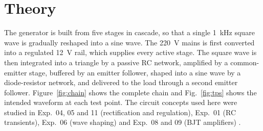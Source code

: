 \documentclass[12pt,a4paper]{article}
\begin{document}
	\section{Theory}
	\label{sec:theory}
	The generator is built from five stages in cascade, so that a single \SI{1}{\kilo\hertz} square wave is gradually reshaped into a sine wave. The \SI{220}{\volt} mains is first converted into a regulated \SI{12}{\volt} rail, which supplies every active stage. The square wave is then integrated into a triangle by a passive RC network, amplified by a common-emitter stage, buffered by an emitter follower, shaped into a sine wave by a diode-resistor network, and delivered to the load through a second emitter follower. Figure~\ref{fig:chain} shows the complete chain and Fig.~\ref{fig:tps} shows the intended waveform at each test point. The circuit concepts used here were studied in Exp.~04, 05 and 11 (rectification and regulation), Exp.~01 (RC transients), Exp.~06 (wave shaping) and Exp.~08 and 09 (BJT amplifiers) \cite{ref:boylestad,ref:sedra}.

\end{document}
